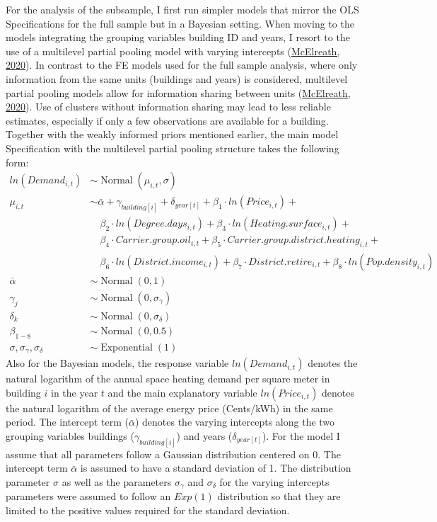 \documentclass[12pt,twoside]{reedthesis}
\begin{document}
For the analysis of the subsample, I first run simpler models that mirror the OLS Specifications for the full sample but in a Bayesian setting. When moving to the models integrating the grouping variables building ID and years, I resort to the use of a multilevel partial pooling model with varying intercepts (\protect\hyperlink{ref-mcelreath20}{McElreath, 2020}). In contrast to the FE models used for the full sample analysis, where only information from the same units (buildings and years) is considered, multilevel partial pooling models allow for information sharing between units (\protect\hyperlink{ref-mcelreath20}{McElreath, 2020}). Use of clusters without information sharing may lead to less reliable estimates, especially if only a few observations are available for a building. Together with the weakly informed priors mentioned earlier, the main model Specification with the multilevel partial pooling structure takes the following form:
\begin{align*}
ln(Demand_{i,t}) & \sim \operatorname{Normal}(\mu_{i,t}, \sigma) \\
\mu_{i,t} & \sim \bar\alpha + \gamma_{building[i]} + \delta_{year[t]} + \beta_1 \cdot ln(Price_{i,t}) +  \\
 & \quad \beta_{2} \cdot ln(Degree.days_{i,t}) + \beta_{3} \cdot ln(Heating.surface_{i,t}) + \\
 & \quad \beta_{4} \cdot Carrier.group.oil_{i,t} + \beta_{5} \cdot Carrier.group.district.heating_{i,t} + \\
 & \quad \beta_{6} \cdot ln(District.income_{i,t}) + \beta_{7} \cdot District.retire_{i,t} + \beta_{8} \cdot ln(Pop.density_{i,t}) \\
\bar\alpha & \sim \operatorname{Normal}(0, 1) \\
\gamma_j & \sim \operatorname{Normal}(0, \sigma_{\gamma}) \\
\delta_k & \sim \operatorname{Normal}(0, \sigma_{\delta}) \\
\beta_{1-8} & \sim \operatorname{Normal}(0, 0.5) \\
\sigma, \sigma_{\gamma}, \sigma_{\delta} & \sim \operatorname{Exponential}(1)
\end{align*}
Also for the Bayesian models, the response variable \(ln(Demand_{i,t})\) denotes the natural logarithm of the annual space heating demand per square meter in building \(i\) in the year \(t\) and the main explanatory variable \(ln(Price_{i,t})\) denotes the natural logarithm of the average energy price (Cents/kWh) in the same period. The intercept term (\(\bar \alpha\)) denotes the varying intercepts along the two grouping variables buildings (\(\gamma_{building[i]}\)) and years (\(\delta_{year[t]}\)). For the model I assume that all parameters follow a Gaussian distribution centered on 0. The intercept term \(\bar \alpha\) is assumed to have a standard deviation of 1. The distribution parameter \(\sigma\) as well as the parameters \(\sigma_{\gamma}\) and \(\sigma_{\delta}\) for the varying intercepts parameters were assumed to follow an \(Exp(1)\) distribution so that they are limited to the positive values required for the standard deviation.
\end{document}
